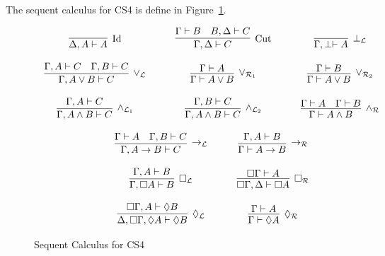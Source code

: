 \documentclass{article}
\begin{document}
The sequent calculus for CS4 is define in Figure~\ref{fig:CS4-seq}.
\begin{figure}
  \begin{center}
    \begin{math}
      \begin{array}{c}
        \begin{array}{cccccccc}
          \infer[\text{Id}]{\Delta,A \vdash A}{
            \,
          }
          & \quad &
          \infer[\text{Cut}]{\Gamma,\Delta \vdash C}{
            \Gamma \vdash B
            &
            B,\Delta \vdash C
          }
          & \quad & 
          \infer[\perp_{\mathcal{L}}]{\Gamma,\perp \vdash A}{
            \,
          }\\\\
          \infer[\lor_{\mathcal{L}}]{\Gamma,A \lor B \vdash C}{
            \Gamma,A \vdash C
            &
            \Gamma,B \vdash C
          }
          & \quad &
          \infer[\lor_{\mathcal{R}_1}]{\Gamma \vdash A \lor B}{
            \Gamma \vdash A
          }
          & \quad &
          \infer[\lor_{\mathcal{R}_2}]{\Gamma \vdash A \lor B}{
            \Gamma \vdash B
          }\\\\
          \infer[\land_{\mathcal{L}_1}]{\Gamma,A \land B \vdash C}{
            \Gamma,A \vdash C
          }
          & \quad &
          \infer[\land_{\mathcal{L}_2}]{\Gamma,A \land B \vdash C}{
            \Gamma,B \vdash C
          }
          & \quad &
          \infer[\land_{\mathcal{R}}]{\Gamma \vdash A \land B}{
            \Gamma \vdash A
            &
            \Gamma \vdash B
          }\\\\
          
        \end{array}
        \\
        \begin{array}{cccccccc}
          \infer[\to_{\mathcal{L}}]{\Gamma,A \to B \vdash C}{
            \Gamma \vdash A
            &
            \Gamma,B \vdash C
          }
          & \quad &
          \infer[\to_{\mathcal{R}}]{\Gamma \vdash A \to B}{
            \Gamma, A \vdash B
          }\\\\
          \infer[\Box_{\mathcal{L}}]{\Gamma, \Box A \vdash B}{
            \Gamma,A \vdash B
          }
          & \quad &
          \infer[\Box_{\mathcal{R}}]{\Box\Gamma,\Delta \vdash \Box A}{
            \Box \Gamma \vdash A
          }\\\\
          \infer[\Diamond_{\mathcal{L}}]{\Delta,\Box\Gamma,\Diamond A \vdash \Diamond B}{
            \Box\Gamma,A \vdash \Diamond B
          }
          & \quad &
          \infer[\Diamond_{\mathcal{R}}]{\Gamma \vdash \Diamond A}{
            \Gamma \vdash A
          }
        \end{array}        
      \end{array}
    \end{math}
  \end{center}
  \caption{Sequent Calculus for CS4}
  \label{fig:CS4-seq}
\end{figure}
\end{document}
